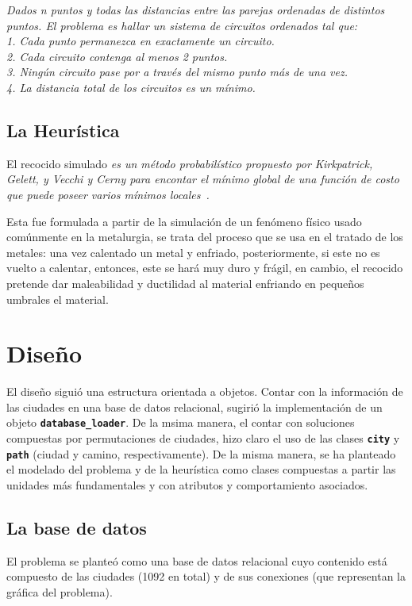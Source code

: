 \documentclass[a4paper]{report}
\begin{document}
\begin{center}
  \textit{Dados n puntos y todas las distancias entre las parejas ordenadas de
    distintos puntos. El problema es hallar un sistema de circuitos ordenados tal que:\\
    1. Cada punto permanezca en exactamente un circuito.\\
    2. Cada circuito contenga al menos 2 puntos.\\
    3. Ning\'un circuito pase por a trav\'es del mismo punto m\'as de una vez.\\
    4. La distancia total de los circuitos es un m\'inimo.
  }~\cite{julia}
\end{center}


\section{La Heur\'istica}
El recocido simulado \textit{es un m\'etodo probabil\'istico propuesto por Kirkpatrick, Gelett,
  y Vecchi y Cerny para encontar el m\'inimo global de una funci\'on de costo que puede poseer
  varios m\'inimos locales~\cite{dimitris}.}

Esta fue formulada a partir de la simulaci\'on de un fen\'omeno f\'isico usado com\'unmente
en la metalurgia, se trata del proceso que se usa en el tratado de los metales:
una vez calentado un metal y enfriado, posteriormente,
si este no es vuelto a calentar, entonces, este se har\'a muy duro y fr\'agil, en cambio, el recocido
pretende dar maleabilidad y ductilidad al material enfriando en peque\~nos umbrales el material.

\chapter{Dise\~no}

El dise\~no sigui\'o una estructura orientada a objetos. Contar con la informaci\'on
de las ciudades en una base de datos relacional, sugiri\'o la implementaci\'on de
un objeto \textbf{\texttt{database\_loader}}. De la msima manera, el contar con soluciones
compuestas por permutaciones de ciudades, hizo claro el uso de las clases
\textbf{\texttt{city}} y \textbf{\texttt{path}} (ciudad y camino, respectivamente).
De la misma manera, se ha planteado el modelado del problema y de la heur\'istica
como clases compuestas a partir las unidades m\'as fundamentales y con atributos y
comportamiento asociados.\\

\section{La base de datos}
El problema se plante\'o como una base de datos relacional cuyo contenido est\'a
compuesto de las ciudades (1092 en total) y de sus conexiones (que representan
la gr\'afica del problema).\\
\end{document}
